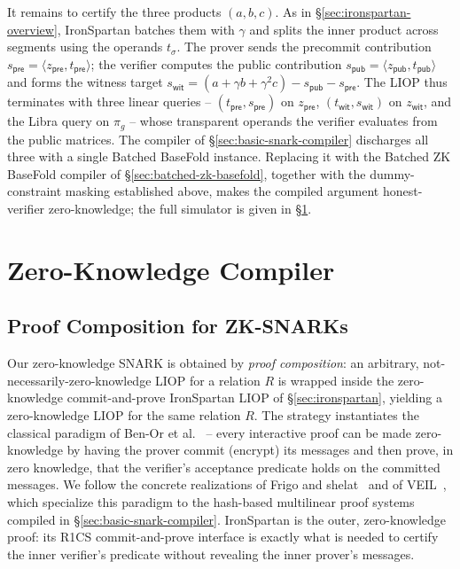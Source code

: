 \documentclass{article}
\theoremstyle{definition}
\begin{document}
It remains to certify the three products $(a, b, c)$. As in \S\ref{sec:ironspartan-overview}, IronSpartan batches them with $\gamma$ and splits the inner product across segments using the operands $t_\sigma$. The prover sends the precommit contribution $s_{\textsf{pre}} = \langle z_{\textsf{pre}}, t_{\textsf{pre}} \rangle$; the verifier computes the public contribution $s_{\textsf{pub}} = \langle z_{\textsf{pub}}, t_{\textsf{pub}} \rangle$ and forms the witness target $s_{\textsf{wit}} = (a + \gamma b + \gamma^2 c) - s_{\textsf{pub}} - s_{\textsf{pre}}$. The LIOP thus terminates with three linear queries -- $(t_{\textsf{pre}}, s_{\textsf{pre}})$ on $z_{\textsf{pre}}$, $(t_{\textsf{wit}}, s_{\textsf{wit}})$ on $z_{\textsf{wit}}$, and the Libra query on $\pi_g$ -- whose transparent operands the verifier evaluates from the public matrices. The compiler of \S\ref{sec:basic-snark-compiler} discharges all three with a single Batched BaseFold instance. Replacing it with the Batched ZK BaseFold compiler of \S\ref{sec:batched-zk-basefold}, together with the dummy-constraint masking established above, makes the compiled argument honest-verifier zero-knowledge; the full simulator is given in \S\ref{sec:zk-compiler}.

\section{Zero-Knowledge Compiler}
\label{sec:zk-compiler}

\subsection{Proof Composition for ZK-SNARKs}
\label{sec:proof-composition}

Our zero-knowledge SNARK is obtained by \emph{proof composition}: an arbitrary, not-necessarily-zero-knowledge LIOP for a relation $R$ is wrapped inside the zero-knowledge commit-and-prove IronSpartan LIOP of \S\ref{sec:ironspartan}, yielding a zero-knowledge LIOP for the same relation $R$. The strategy instantiates the classical paradigm of Ben-Or et al.~\cite{10.5555/88314.88333} -- every interactive proof can be made zero-knowledge by having the prover commit (encrypt) its messages and then prove, in zero knowledge, that the verifier's acceptance predicate holds on the committed messages. We follow the concrete realizations of Frigo and shelat~\cite{Frigo:2024aa} and of VEIL~\cite{cryptoeprint:2026/683}, which specialize this paradigm to the hash-based multilinear proof systems compiled in \S\ref{sec:basic-snark-compiler}. IronSpartan is the outer, zero-knowledge proof: its R1CS commit-and-prove interface is exactly what is needed to certify the inner verifier's predicate without revealing the inner prover's messages.
\end{document}
